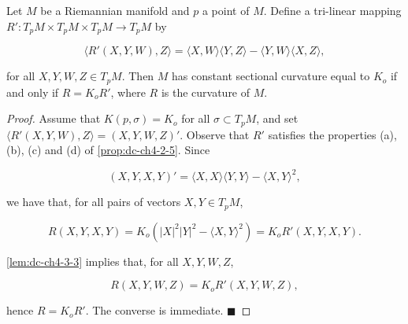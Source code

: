 \begin{lemma}
  \label{lem:dc-ch4-3-4}
  \leanok
  Let $M$ be a Riemannian manifold and $p$ a point of $M$. Define a tri-linear
  mapping $R':T_pM\times T_pM\times T_pM\to T_pM$ by
  
  $$
  \langle R'(X,Y,W),Z\rangle=\langle X,W\rangle\langle Y,Z\rangle-\langle Y,W\rangle\langle X,Z\rangle,
  $$
  
  for all $X,Y,W,Z\in T_pM$. Then $M$ has constant sectional curvature equal to
  $K_o$ if and only if $R=K_o R'$, where $R$ is the curvature of $M$.
\end{lemma}
\begin{proof}
  \leanok
  Assume that $K(p,\sigma)=K_o$ for all $\sigma\subset T_pM$, and set
  $\langle R'(X,Y,W),Z\rangle=(X,Y,W,Z)'$. Observe that $R'$ satisfies the properties
  (a), (b), (c) and (d) of \cref{prop:dc-ch4-2-5}. Since
  
  $$
  (X,Y,X,Y)'=\langle X,X\rangle\langle Y,Y\rangle-\langle X,Y\rangle^2,
  $$
  
  we have that, for all pairs of vectors $X,Y\in T_pM$,
  
  $$
  R(X,Y,X,Y)=K_o(|X|^2|Y|^2-\langle X,Y\rangle^2)=K_o R'(X,Y,X,Y).
  $$
  
  \cref{lem:dc-ch4-3-3} implies that, for all $X,Y,W,Z$,
  
  $$
  R(X,Y,W,Z)=K_o R'(X,Y,W,Z),
  $$
  
  hence $R=K_o R'$. The converse is immediate. $\blacksquare$
\end{proof}

